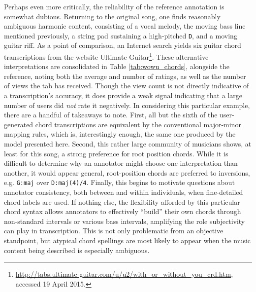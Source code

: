 Perhaps even more critically, the reliability of the reference annotation is somewhat dubious.
Returning to the original song, one finds reasonably ambiguous harmonic content, consisting of a vocal melody, the moving bass line mentioned previously, a string pad sustaining a high-pitched \texttt{D}, and a moving guitar riff.
As a point of comparison, an Internet search yields six guitar chord transcriptions from the website Ultimate Guitar\footnote{\url{http://tabs.ultimate-guitar.com/u/u2/with_or_without_you_crd.htm},  accessed 19 April 2015.}.
These alternative interpretations are consolidated in Table \ref{tab:wowu_chords}, alongside the reference, noting both the average and number of ratings, as well as the number of views the tab has received.
Though the view count is not directly indicative of a transcription's accuracy, it does provide a weak signal indicating that a large number of users did \emph{not} rate it negatively.
In considering this particular example, there are a handful of takeaways to note.
First, all but the sixth of the user-generated chord transcriptions are equivalent by the conventional major-minor mapping rules, which is, interestingly enough, the same one produced by the model presented here.
Second, this rather large community of musicians shows, at least for this song, a strong preference for root position chords.
While it is difficult to determine why an annotator might choose one interpretation than another, it would appear general, root-position chords are preferred to inversions, e.g. \texttt{G:maj} over \texttt{D:maj(4)/4}.
Finally, this begins to motivate questions about annotator consistency, both between and within individuals, when fine-detailed chord labels are used.
If nothing else, the flexibility afforded by this particular chord syntax allows annotators to effectively ``build'' their own chords through non-standard intervals or various bass intervals, amplifying the role subjectivity can play in transcription.
This is not only problematic from an objective standpoint, but atypical chord spellings are most likely to appear when the music content being described is especially ambiguous.


